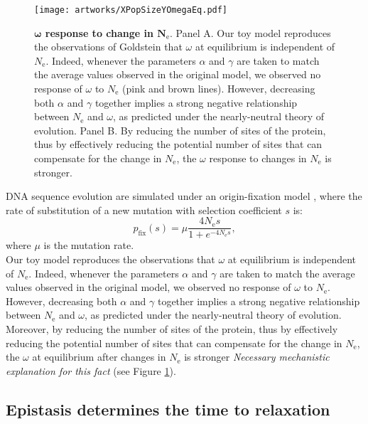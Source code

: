 \documentclass{article}
\newcommand{\Ne}{N_{\mathrm{e}}}
\newcommand{\dnds}{\omega}
\begin{document}
\begin{figure}[htb!]
\begin{mdframed}
	\centering
	\texttt{[image: artworks/XPopSizeYOmegaEq.pdf]}
	\vspace*{0.2em}
	\caption{
		\textbf{$\bm{\dnds}$ response to change in $\bm{\Ne}$}.
		Panel A. Our toy model reproduces the observations of Goldstein \cite{Goldstein2013} that $\dnds$ at equilibrium is independent of $\Ne$. Indeed, whenever the parameters $\alpha$ and $\gamma$ are taken to match the average values observed in the original model, we observed no response of $\dnds$ to $\Ne$ (pink and brown lines).
		However, decreasing both $\alpha$ and $\gamma$ together implies a strong negative relationship between $\Ne$ and $\dnds$, as predicted under the nearly-neutral theory of evolution.
		Panel B. By reducing the number of sites of the protein, thus by effectively reducing the potential number of sites that can compensate for the change in $\Ne$, the $\dnds$ response to changes in $\Ne$ is stronger.
	}
	\label{fig:EqdndsNe}
\end{mdframed}
\end{figure}

DNA sequence evolution are simulated under an origin-fixation model \cite{McCandlish2014}, where the rate of substitution of a new mutation with selection coefficient $s$ is:
\begin{equation}
p_{\text{fix}}(s) = \mu \dfrac{4 \Ne s}{1 + e^{- 4 \Ne s }}, 
\end{equation}
where $\mu$ is the mutation rate.\\

Our toy model reproduces the observations that $\dnds$ at equilibrium is independent of $\Ne$. Indeed, whenever the parameters $\alpha$ and $\gamma$ are taken to match the average values observed in the original model, we observed no response of $\dnds$ to $\Ne$.
However, decreasing both $\alpha$ and $\gamma$ together implies a strong negative relationship between $\Ne$ and $\dnds$, as predicted under the nearly-neutral theory of evolution.
Moreover, by reducing the number of sites of the protein, thus by effectively reducing the potential number of sites that can compensate for the change in $\Ne$, the $\dnds$ at equilibrium after changes in $\Ne$ is stronger \textit{Necessary mechanistic explanation for this fact} (see Figure \ref{fig:EqdndsNe}).

\subsection{Epistasis determines the time to relaxation}
\end{document}
